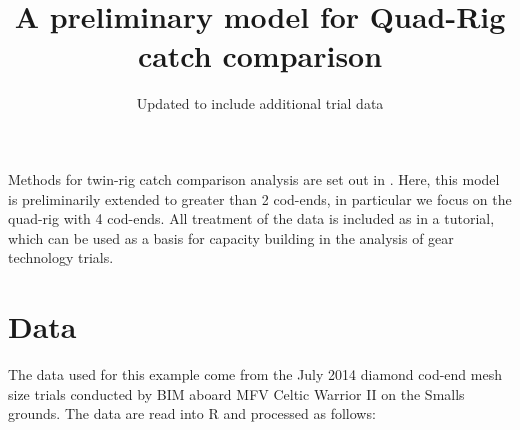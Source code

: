 \documentclass[12pt]{article}\usepackage[]{graphicx}\usepackage[]{color}
\title{A preliminary model for Quad-Rig catch comparison}
\author{Updated to include additional trial data}
\date{}
\begin{document}
\maketitle
Methods for twin-rig catch comparison analysis are set out in \citet{Holst:Reville:2009}. Here, this model is preliminarily extended to greater than 2 cod-ends, in particular we focus on the quad-rig with 4 cod-ends. All treatment of the data is included as in a tutorial, which can be used as a basis for capacity building in the analysis of gear technology trials.

\section{Data}
The data used for this example come from the July 2014 diamond cod-end mesh size trials conducted by BIM aboard MFV Celtic Warrior II on the Smalls grounds. The data are read into R and processed as follows:
\end{document}
